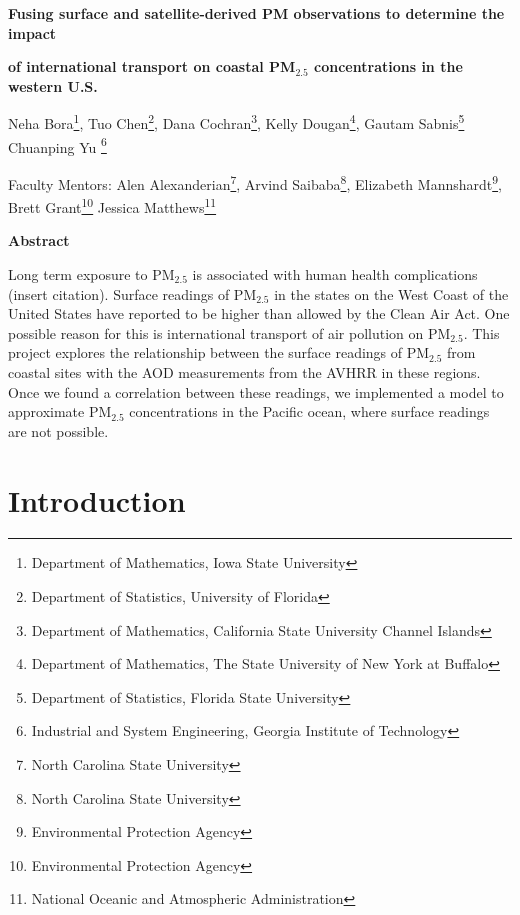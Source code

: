 \documentclass[10pt]{article}
\begin{document}
\centerline{\large \bf Fusing surface and satellite-derived PM observations to determine the impact } 

\centerline{\large \bf of international transport on coastal PM$_{2.5}$ concentrations in the western U.S.}

\vspace{.1truein}

\def\thefootnote{\arabic{footnote}}
\begin{center}
  Neha Bora\footnote{Department of Mathematics, Iowa State University},
  Tuo Chen\footnote{Department of Statistics, University of Florida},
  Dana Cochran\footnote{Department of Mathematics, California State University Channel Islands},
  Kelly Dougan\footnote{Department of Mathematics, The State University of New York at Buffalo},
  Gautam Sabnis\footnote{Department of Statistics, Florida State University}
  Chuanping Yu \footnote{Industrial and System Engineering, Georgia Institute of Technology}
\end{center}


\begin{center}
Faculty Mentors: Alen Alexanderian\footnote{North Carolina State University},
Arvind Saibaba\footnote{North Carolina State University},
Elizabeth Mannshardt\footnote{Environmental Protection Agency}, 
Brett Grant\footnote{Environmental Protection Agency}
Jessica Matthews\footnote{National Oceanic and Atmospheric Administration}
\end{center}


\vspace{.3truein}
\centerline{\bf Abstract}

Long term exposure to PM$_{2.5}$ is associated with human health complications (insert citation). Surface readings of PM$_{2.5}$ in the states on the West Coast of the United States have reported to be higher than allowed by the Clean Air Act. One possible reason for this is international transport of air pollution on PM$_{2.5}$. This project explores the relationship between the surface readings of PM$_{2.5}$ from coastal sites with the AOD measurements from the AVHRR in these regions. Once we found a correlation between these readings, we implemented a model to approximate PM$_{2.5}$ concentrations in the Pacific ocean, where surface readings are not possible.

\section{Introduction}
\end{document}
